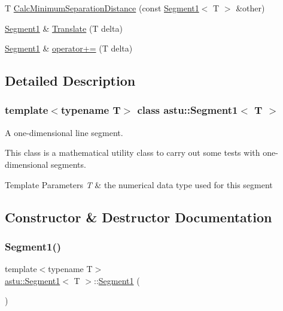 \begin{DoxyCompactItemize}
\item 
T \hyperlink{classastu_1_1Segment1_a13e7485b944e90e4ce4767710a5d97cd}{Calc\+Minimum\+Separation\+Distance} (const \hyperlink{classastu_1_1Segment1}{Segment1}$<$ T $>$ \&other)
\item 
\hyperlink{classastu_1_1Segment1}{Segment1} \& \hyperlink{classastu_1_1Segment1_aff508149bdb4dc360d733903d01d396d}{Translate} (T delta)
\item 
\hyperlink{classastu_1_1Segment1}{Segment1} \& \hyperlink{classastu_1_1Segment1_a8d762aaefb9b496edb08fd5bccb59b2b}{operator+=} (T delta)
\end{DoxyCompactItemize}


\subsection{Detailed Description}
\subsubsection*{template$<$typename T$>$\newline
class astu\+::\+Segment1$<$ T $>$}

A one-\/dimensional line segment.

This class is a mathematical utility class to carry out some tests with one-\/dimensional segments.


\begin{DoxyTemplParams}{Template Parameters}
{\em T} & the numerical data type used for this segment \\
\hline
\end{DoxyTemplParams}


\subsection{Constructor \& Destructor Documentation}
\mbox{\label{classastu_1_1Segment1_a259c9cbda64ad57694e33eb5509b52b8}} 
\subsubsection{\texorpdfstring{Segment1()}{Segment1()}\hspace{0.1cm}{\footnotesize\ttfamily [1/2]}}
{\footnotesize\ttfamily template$<$typename T$>$ \\
\hyperlink{classastu_1_1Segment1}{astu\+::\+Segment1}$<$ T $>$\+::\hyperlink{classastu_1_1Segment1}{Segment1} (\begin{DoxyParamCaption}{ }\end{DoxyParamCaption})\hspace{0.3cm}{\ttfamily [inline]}}

